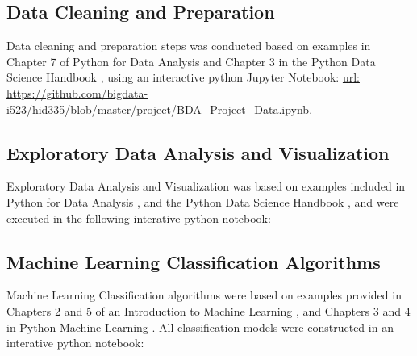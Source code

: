 \documentclass[sigconf]{acmart}
\begin{document}
\subsection{Data Cleaning and Preparation \cite{mckinney17}}

Data cleaning and preparation steps was conducted based on examples in 
Chapter 7 of Python for Data Analysis \cite{mckinney17} and Chapter 3 in 
the Python Data Science Handbook \cite{vanderplas17}, using an interactive 
python Jupyter Notebook: \url{url: https://github.com/bigdata-i523/hid335/blob/master/project/BDA_Project_Data.ipynb}.

\subsection{Exploratory Data Analysis and Visualization\cite{vanderplas17}}

Exploratory Data Analysis and Visualization was based on examples included
in Python for Data Analysis \cite{mckinney17}, and the Python Data Science 
Handbook \cite{vanderplas17}, and were executed in the following interative
python notebook: 


\subsection{Machine Learning Classification Algorithms\cite{muller17, raschka17}}
Machine Learning Classification algorithms were based on examples provided
in Chapters 2 and 5 of an Introduction to Machine Learning \cite{muller17},
and Chapters 3 and 4 in Python Machine Learning \cite{raschka17}. All 
classification models were constructed in an interative python notebook: 





%
\end{document}
